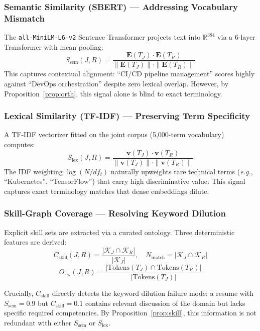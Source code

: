 \documentclass[smallcondensed,numbers]{sn-jnl}
\begin{document}
\subsubsection{Semantic Similarity (SBERT) --- Addressing Vocabulary Mismatch}
The \texttt{all-MiniLM-L6-v2} Sentence Transformer projects text into $\mathbb{R}^{384}$ via a 6-layer Transformer with mean pooling:
\begin{equation}
    S_{\mathrm{sem}}(J, R) = \frac{\mathbf{E}(T_J) \cdot \mathbf{E}(T_R)}{\|\mathbf{E}(T_J)\| \cdot \|\mathbf{E}(T_R)\|}
\end{equation}
This captures contextual alignment: ``CI/CD pipeline management'' scores highly against ``DevOps orchestration'' despite zero lexical overlap. However, by Proposition~\ref{prop:orth}, this signal alone is blind to exact terminology.

\subsubsection{Lexical Similarity (TF-IDF) --- Preserving Term Specificity}
A TF-IDF vectorizer fitted on the joint corpus (5,000-term vocabulary) computes:
\begin{equation}
    S_{\mathrm{lex}}(J, R) = \frac{\mathbf{v}(T_J) \cdot \mathbf{v}(T_R)}{\|\mathbf{v}(T_J)\| \cdot \|\mathbf{v}(T_R)\|}
\end{equation}
The IDF weighting $\log(N/df_t)$ naturally upweights rare technical terms (\textit{e.g.}, ``Kubernetes'', ``TensorFlow'') that carry high discriminative value. This signal captures exact terminology matches that dense embeddings dilute.

\subsubsection{Skill-Graph Coverage --- Resolving Keyword Dilution}
Explicit skill sets are extracted via a curated ontology. Three deterministic features are derived:
\begin{equation}
    C_{\mathrm{skill}}(J, R) = \frac{|\mathcal{K}_J \cap \mathcal{K}_R|}{|\mathcal{K}_J|}, \quad
    N_{\mathrm{match}} = |\mathcal{K}_J \cap \mathcal{K}_R|
\end{equation}
\begin{equation}
    O_{\mathrm{kw}}(J, R) = \frac{|\mathrm{Tokens}(T_J) \cap \mathrm{Tokens}(T_R)|}{|\mathrm{Tokens}(T_J)|}
\end{equation}

Crucially, $C_\text{skill}$ directly detects the keyword dilution failure mode: a resume with $S_\text{sem} = 0.9$ but $C_\text{skill} = 0.1$ contains relevant discussion of the domain but lacks specific required competencies. By Proposition~\ref{prop:skill}, this information is not redundant with either $S_\text{sem}$ or $S_\text{lex}$.
\end{document}
